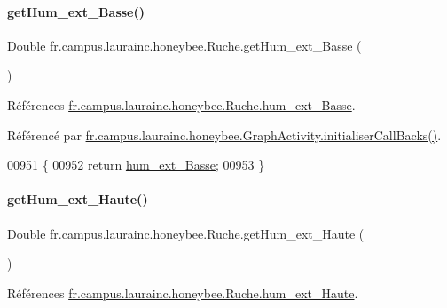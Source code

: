\paragraph{\texorpdfstring{get\+Hum\+\_\+ext\+\_\+\+Basse()}{getHum\_ext\_Basse()}}
{\footnotesize\ttfamily Double fr.\+campus.\+laurainc.\+honeybee.\+Ruche.\+get\+Hum\+\_\+ext\+\_\+\+Basse (\begin{DoxyParamCaption}{ }\end{DoxyParamCaption})}



Références \hyperlink{classfr_1_1campus_1_1laurainc_1_1honeybee_1_1_ruche_a6aea5ac6dffbcfdfb0a8596c177de0f6}{fr.\+campus.\+laurainc.\+honeybee.\+Ruche.\+hum\+\_\+ext\+\_\+\+Basse}.



Référencé par \hyperlink{classfr_1_1campus_1_1laurainc_1_1honeybee_1_1_graph_activity_a8dc56c3e0744bcb9295ad10e726b5fdb}{fr.\+campus.\+laurainc.\+honeybee.\+Graph\+Activity.\+initialiser\+Call\+Backs()}.


\begin{DoxyCode}
00951                                      \{
00952         \textcolor{keywordflow}{return} \hyperlink{classfr_1_1campus_1_1laurainc_1_1honeybee_1_1_ruche_a6aea5ac6dffbcfdfb0a8596c177de0f6}{hum\_ext\_Basse};
00953     \}
\end{DoxyCode}
\mbox{\label{classfr_1_1campus_1_1laurainc_1_1honeybee_1_1_ruche_a71dec356de4ad4da36031774815d6993}} 
\paragraph{\texorpdfstring{get\+Hum\+\_\+ext\+\_\+\+Haute()}{getHum\_ext\_Haute()}}
{\footnotesize\ttfamily Double fr.\+campus.\+laurainc.\+honeybee.\+Ruche.\+get\+Hum\+\_\+ext\+\_\+\+Haute (\begin{DoxyParamCaption}{ }\end{DoxyParamCaption})}



Références \hyperlink{classfr_1_1campus_1_1laurainc_1_1honeybee_1_1_ruche_a4704dea77345a189a860088023a56726}{fr.\+campus.\+laurainc.\+honeybee.\+Ruche.\+hum\+\_\+ext\+\_\+\+Haute}.



